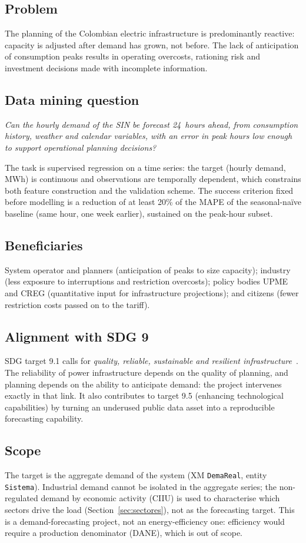\documentclass[conference,10pt]{IEEEtran}
\begin{document}
\subsection{Problem}
The planning of the Colombian electric infrastructure is predominantly reactive: capacity is adjusted after demand has grown, not before. The lack of anticipation of consumption peaks results in operating overcosts, rationing risk and investment decisions made with incomplete information.

\subsection{Data mining question}
\emph{Can the hourly demand of the SIN be forecast 24~hours ahead, from consumption history, weather and calendar variables, with an error in peak hours low enough to support operational planning decisions?}

The task is supervised regression on a time series: the target (hourly demand, MWh) is continuous and observations are temporally dependent, which constrains both feature construction and the validation scheme. The success criterion fixed before modelling is a reduction of at least 20\% of the MAPE of the seasonal-naïve baseline (same hour, one week earlier), sustained on the peak-hour subset.

\subsection{Beneficiaries}
System operator and planners (anticipation of peaks to size capacity); industry (less exposure to interruptions and restriction overcosts); policy bodies UPME and CREG (quantitative input for infrastructure projections); and citizens (fewer restriction costs passed on to the tariff).

\subsection{Alignment with SDG 9}
SDG target 9.1 calls for \emph{quality, reliable, sustainable and resilient infrastructure}~\cite{un_sdg9}. The reliability of power infrastructure depends on the quality of planning, and planning depends on the ability to anticipate demand: the project intervenes exactly in that link. It also contributes to target 9.5 (enhancing technological capabilities) by turning an underused public data asset into a reproducible forecasting capability.

\subsection{Scope}
The target is the aggregate demand of the system (XM \texttt{DemaReal}, entity \texttt{Sistema}). Industrial demand cannot be isolated in the aggregate series; the non-regulated demand by economic activity (CIIU) is used to characterise which sectors drive the load (Section~\ref{sec:sectores}), not as the forecasting target. This is a demand-forecasting project, not an energy-efficiency one: efficiency would require a production denominator (DANE), which is out of scope.
\end{document}
